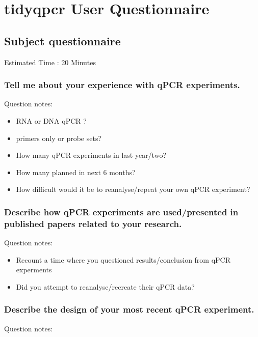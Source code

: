 \documentclass[../main.tex]{subfiles}
\begin{document}
\section{tidyqpcr User Questionnaire}
\subsection{Subject questionnaire}
Estimated Time : 20 Minutes

\subsubsection{Tell me about your experience with qPCR experiments.}

Question notes:
\begin{itemize}
    \item RNA or DNA qPCR ?
    \item primers only or probe sets?
    \item How many qPCR experiments in last year/two?
    \item How many planned in next 6 months?
    \item How difficult would it be to reanalyse/repeat your own qPCR experiment?
\end{itemize}

\subsubsection{Describe how qPCR experiments are used/presented in published papers related to your research.}

Question notes:
\begin{itemize}
    \item Recount a time where you questioned results/conclusion from qPCR experments
    \item Did you attempt to reanalyse/recreate their qPCR data?
\end{itemize}

\subsubsection{Describe the design of your most recent qPCR experiment.}

Question notes:
\end{document}
